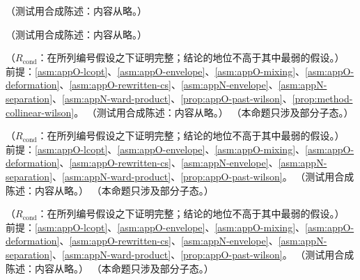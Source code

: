 \begin{remark}\label{rem:appO-timelike}
（测试用合成陈述：内容从略。）
\end{remark}

\begin{remark}[在壳线的两粒子幺正性（$O(g^4)$）]\label{rem:appO-onshell-unitarity}
（测试用合成陈述：内容从略。）
\end{remark}

\begin{theorem}\label{thm:appO-main}
（$R_{\mathrm{cond}}$：在所列编号假设之下证明完整；结论的地位不高于其中最弱的假设。）
前提：\cref{asm:appO-lcopt}、\cref{asm:appO-envelope}、\cref{asm:appO-mixing}、\cref{asm:appO-deformation}、\cref{asm:appO-rewritten-cs}、\cref{asm:appN-envelope}、\cref{asm:appN-separation}、\cref{asm:appN-ward-product}、\cref{prop:appO-past-wilson}、\cref{prop:method-collinear-wilson}。
（测试用合成陈述：内容从略。）
（本命题只涉及部分子态。）
\end{theorem}

\begin{corollary}\label{cor:appO-interface}
（$R_{\mathrm{cond}}$：在所列编号假设之下证明完整；结论的地位不高于其中最弱的假设。）
前提：\cref{asm:appO-lcopt}、\cref{asm:appO-envelope}、\cref{asm:appO-mixing}、\cref{asm:appO-deformation}、\cref{asm:appO-rewritten-cs}、\cref{asm:appN-envelope}、\cref{asm:appN-separation}、\cref{asm:appN-ward-product}、\cref{prop:appO-past-wilson}。
（测试用合成陈述：内容从略。）
（本命题只涉及部分子态。）
\end{corollary}

\begin{proposition}\label{prop:appO-tmd}
（$R_{\mathrm{cond}}$：在所列编号假设之下证明完整；结论的地位不高于其中最弱的假设。）
前提：\cref{asm:appO-lcopt}、\cref{asm:appO-envelope}、\cref{asm:appO-mixing}、\cref{asm:appO-deformation}、\cref{asm:appO-rewritten-cs}、\cref{asm:appN-envelope}、\cref{asm:appN-separation}、\cref{asm:appN-ward-product}、\cref{prop:appO-past-wilson}。
（测试用合成陈述：内容从略。）
（本命题只涉及部分子态。）
\end{proposition}

